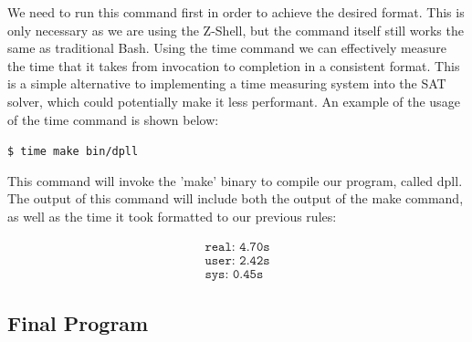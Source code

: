 \documentclass{article}
\begin{document}
We need to run this command first in order to achieve the desired format. This is only necessary as we are using the
Z-Shell, but the command itself still works the same as traditional Bash. Using the time command we can effectively measure the time that it takes from invocation to completion in a consistent format. This is a simple alternative to implementing a time measuring system into the SAT solver, which could potentially make it less performant. An example of the usage of the time command is shown below:

\begin{center}
    \texttt{\$ time make bin/dpll}
\end{center}

This command will invoke the 'make' binary to compile our program, called dpll. The output of this command will include both the output of the make command, as well as the time it took formatted to our previous rules:

\begin{align*}
    \texttt{real: 4.70s} \\
    \texttt{user: 2.42s} \\
    \texttt{sys: 0.45s}
\end{align*}


\subsection{Final Program}
\end{document}
